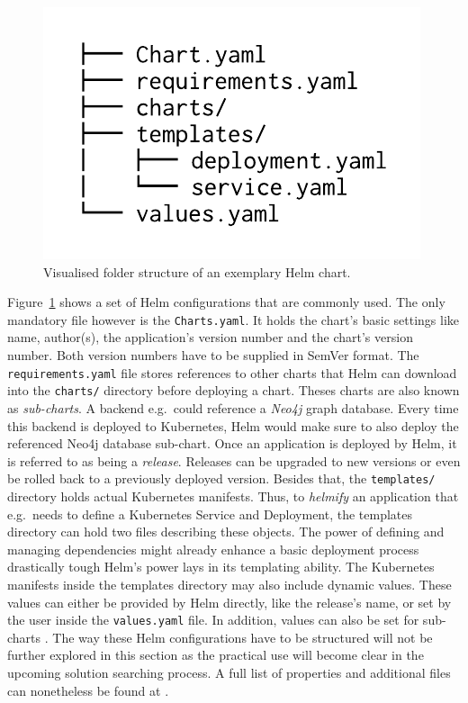 \begin{figure}[H]
\begin{center}
  \includegraphics[scale=0.8]{images/figures/directory_listing_example_chart.pdf}
\end{center}
\caption{Visualised folder structure of an exemplary Helm chart.}%
\label{fig:helm_chart_folder_example}
\end{figure}

Figure~\ref{fig:helm_chart_folder_example} shows a set of Helm configurations
that are commonly used. The only mandatory file however is the
\texttt{Charts.yaml}. It holds the chart's basic settings like name, author(s),
the application's version number and the chart's version number. Both version
numbers have to be supplied in SemVer format. The \texttt{requirements.yaml}
file stores references to other charts that Helm can download into the
\texttt{charts/} directory before deploying a chart. Theses charts are also
known as \textit{sub-charts}. A backend e.g.\ could reference a \textit{Neo4j}
graph database. Every time this backend is deployed to Kubernetes, Helm would
make sure to also deploy the referenced Neo4j database sub-chart. Once an
application is deployed by Helm, it is referred to as being a \textit{release}.
Releases can be upgraded to new versions or even be rolled back to a previously
deployed version. Besides that, the \texttt{templates/} directory holds actual
Kubernetes manifests. Thus, to \textit{helmify} an application that e.g.\ needs
to define a Kubernetes Service and Deployment, the templates directory can hold
two files describing these objects. The power of defining and managing
dependencies might already enhance a basic deployment process drastically tough
Helm's power lays in its templating ability. The Kubernetes manifests inside
the templates directory may also include dynamic values. These values can
either be provided by Helm directly, like the release's name, or set by the
user inside the \texttt{values.yaml} file. In addition, values can also be set
for sub-charts \autocite{HelmDocumentationCharts}. The way these Helm
configurations have to be structured will not be further explored in this
section as the practical use will become clear in the upcoming solution
searching process. A full list of properties and additional files can
nonetheless be found at \autocite{HelmDocumentationCharts}.

